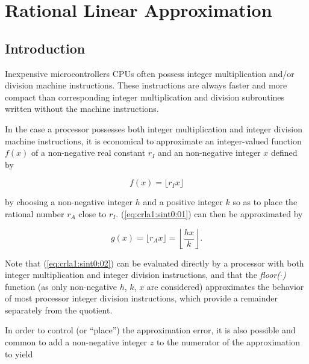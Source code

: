 
\chapter{Rational Linear Approximation}

\label{crla1}

\section{Introduction}
\label{crla1:sint0}

Inexpensive microcontrollers CPUs often possess integer multiplication 
and/or division machine instructions.
These instructions are always faster and more compact than corresponding
integer multiplication and division subroutines written without the
machine instructions.

In the case a processor possesses both integer multiplication and integer division 
machine instructions, it is economical to approximate an integer-valued
function $f(x)$ of a non-negative real constant $r_I$ and an 
non-negative integer $x$ defined
by

\begin{equation}
\label{eq:crla1:sint0:01}
f(x) = \lfloor r_I x \rfloor
\end{equation}

\noindent{}by choosing a non-negative integer $h$ and 
a positive integer $k$ so as to place
the rational number $r_A$ close to $r_I$\@.
(\ref{eq:crla1:sint0:01}) can then be
approximated by

\begin{equation}
\label{eq:crla1:sint0:02}
g(x) = \lfloor r_A x \rfloor 
= \left\lfloor \frac{hx}{k} \right\rfloor. 
\end{equation}

Note that (\ref{eq:crla1:sint0:02}) can be evaluated directly
by a processor with both integer multiplication and integer division
instructions, and that the 
\emph{floor($\cdot$)} function (as only non-negative $h$, $k$, $x$ are
considered) approximates the behavior of most processor integer division
instructions, which provide a remainder separately from the quotient.

In order to control (or ``place'') 
the approximation error,
it is also possible and common to add a non-negative integer $z$ to the numerator
of the approximation to yield

